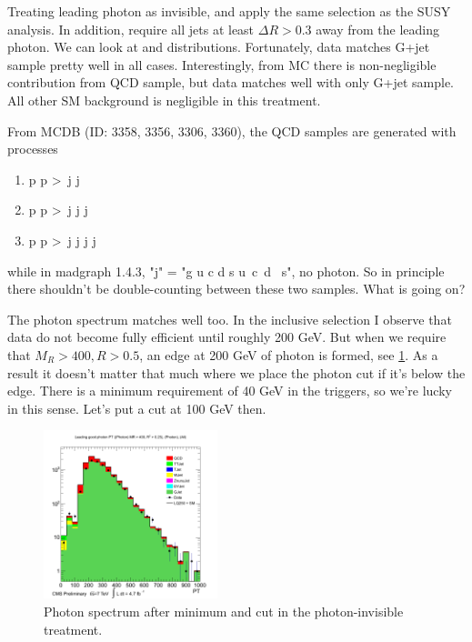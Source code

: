 

Treating leading photon as invisible, and apply the same selection as the SUSY analysis.
In addition, require all jets at least $\Delta R > 0.3$ away from the leading photon.
We can look at \MR and \R distributions.  Fortunately, data matches G+jet sample pretty
well in all cases.  Interestingly, from MC there is non-negligible contribution from QCD
sample, but data matches well with only G+jet sample.  All other SM background is
negligible in this treatment.

From MCDB (ID: 3358, 3356, 3306, 3360), the QCD samples are generated with processes
\begin{enumerate}
\item p p \textgreater ~j j
\item p p \textgreater ~j j j
\item p p \textgreater ~j j j j
\end{enumerate}
while in madgraph 1.4.3, "j" = "g u c d s u\tweakedtilde~c\tweakedtilde~d\tweakedtilde
~s\tweakedtilde", no photon.  So in principle there shouldn't
be double-counting between these two samples.  What is going on?  \ActionItem

The photon \PT spectrum matches well too.  In the inclusive selection I observe that data
do not become fully efficient until roughly 200 GeV.  But when we require that $M_R > 400,
R > 0.5$, an edge at 200 GeV of photon \PT is formed, see \ref{Figure_7731_PhotonPT}.
As a result it doesn't matter that much where we place the photon \PT cut if it's below the edge.
There is a minimum \PT requirement of 40 GeV in the triggers, so we're lucky in this sense.
Let's put a cut at 100 GeV then.

\begin{figure}
\centering
\includegraphics[width=0.45\textwidth]{7731/HPhotonPT_MR400R2025_Photon_All_WithLQ250.png}
\caption{Photon \PT spectrum after minimum \MR and \R cut in the photon-invisible treatment.}
\label{Figure_7731_PhotonPT}
\end{figure}

